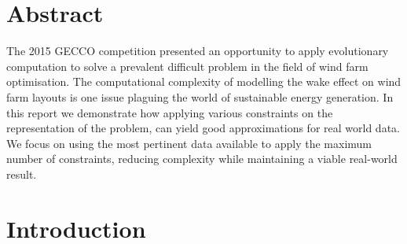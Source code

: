 \documentclass{article}
\begin{document}
\myabstract{}
\renewcommand{\myTitle}{Wind farm layout optimisation using a genetic algorithm
}
\renewcommand{\MyAuthor}{Ryan Shaw $^{1}$, Bharath Shivamogga-Jairam$^{2}$, Filip Tobolewski$^{3}$, Mingting Hong$^{4}$, Arif Malik$^{5}$}
\renewcommand{\MyDepartment}{Department of Computer Science}

\maketitle
\onehalfspacing
\section{Abstract}
The 2015 GECCO competition presented an opportunity to apply evolutionary computation to solve a prevalent difficult problem in the field of wind farm optimisation. The computational complexity of modelling the wake effect on wind farm layouts is one issue plaguing the world of sustainable energy generation. In this report we demonstrate how applying various constraints on the representation of the problem, can yield good approximations for real world data. We focus on using the most pertinent data available to apply the maximum number of constraints, reducing complexity while maintaining a viable real-world result. 

\section{Introduction}
\end{document}
